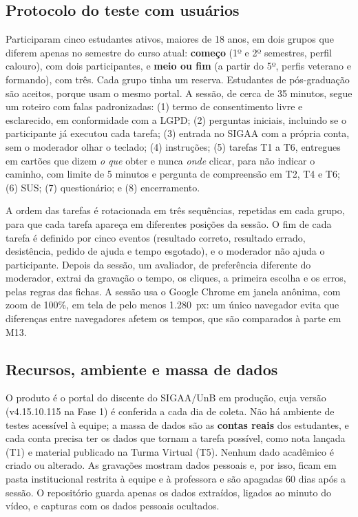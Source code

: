 \subsection{Protocolo do teste com usuários}
\label{sec:protocolo}

Participaram cinco estudantes ativos, maiores de 18 anos, em dois grupos que diferem apenas no semestre do curso atual: \textbf{começo} (1º e 2º semestres, perfil calouro), com dois participantes, e \textbf{meio ou fim} (a partir do 5º, perfis veterano e formando), com três. Cada grupo tinha um reserva. Estudantes de pós-graduação são aceitos, porque usam o mesmo portal. A sessão, de cerca de 35 minutos, segue um roteiro com falas padronizadas: (1) termo de consentimento livre e esclarecido, em conformidade com a LGPD; (2) perguntas iniciais, incluindo se o participante já executou cada tarefa; (3) entrada no SIGAA com a própria conta, sem o moderador olhar o teclado; (4) instruções; (5) tarefas T1 a T6, entregues em cartões que dizem \textit{o que} obter e nunca \textit{onde} clicar, para não indicar o caminho, com limite de 5 minutos e pergunta de compreensão em T2, T4 e T6; (6) SUS; (7) questionário; e (8) encerramento.

A ordem das tarefas é rotacionada em três sequências, repetidas em cada grupo, para que cada tarefa apareça em diferentes posições da sessão. O fim de cada tarefa é definido por cinco eventos (resultado correto, resultado errado, desistência, pedido de ajuda e tempo esgotado), e o moderador não ajuda o participante. Depois da sessão, um avaliador, de preferência diferente do moderador, extrai da gravação o tempo, os cliques, a primeira escolha e os erros, pelas regras das fichas. A sessão usa o Google Chrome em janela anônima, com zoom de 100\%, em tela de pelo menos 1.280~px: um único navegador evita que diferenças entre navegadores afetem os tempos, que são comparados à parte em M13.

\subsection{Recursos, ambiente e massa de dados}

O produto é o portal do discente do SIGAA/UnB em produção, cuja versão (v4.15.10.115 na Fase 1) é conferida a cada dia de coleta. Não há ambiente de testes acessível à equipe; a massa de dados são as \textbf{contas reais} dos estudantes, e cada conta precisa ter os dados que tornam a tarefa possível, como nota lançada (T1) e material publicado na Turma Virtual (T5). Nenhum dado acadêmico é criado ou alterado. As gravações mostram dados pessoais e, por isso, ficam em pasta institucional restrita à equipe e à professora e são apagadas 60 dias após a sessão. O repositório guarda apenas os dados extraídos, ligados ao minuto do vídeo, e capturas com os dados pessoais ocultados.

